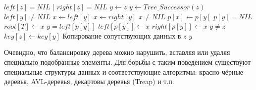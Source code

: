 \documentclass[11pt]{article}
\begin{document}
\begin{codebox}
\li \If $left[z] = NIL$ | $right[z] = NIL$
\li   \Then $y \gets z$
\li   \Else $y \gets Tree\_Successor(z)$
  \End
\li \If $left[y] \neq NIL$
\li   \Then $x \gets left[y]$
\li   \Else $x \gets right[y]$
  \End
\li \If $x \neq NIL$
\li   \Then $p[x] \gets p[y]$
  \End
\li \If $p[y] = NIL$
\li   \Then $root[T] \gets x$
\li   \Else \If $y = left[p[y]]$
\li         \Then $left[p[y]] \gets x$
\li         \Else $right[p[y]] \gets x$
  \End
\End
\li \If $y \neq z$
\li   \Then $key[z] \gets key[y]$
\li   \Comment Копирование сопутствующих данных в $z$
  \End
\li \Return $y$
\End
\end{codebox}

Очевидно, что балансировку дерева можно нарушить, вставляя или удаляя специально
подобранные элементы. Для борьбы с таким поведением существуют специальные
структуры данных и соответствующие алгоритмы: красно-чёрные деревья, AVL-деревья,
декартовы деревья (Treap) и т.п.
\end{document}

